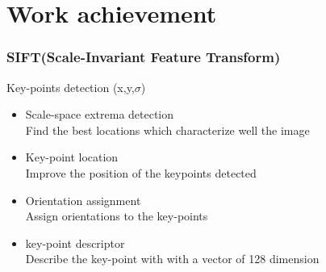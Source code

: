 \documentclass[xcolor=table]{beamer}
\begin{document}
\section{Work achievement}
\begin{frame} \frametitle{SIFT(Scale-Invariant Feature Transform)}

Key-points detection (x,y,$\sigma$)
\begin{itemize}

\item Scale-space extrema detection\\
Find the best locations which characterize well the image

 \item  Key-point location\\
 Improve the position of the keypoints detected

\item Orientation assignment\\
 Assign orientations to the key-points

\item key-point descriptor \\
Describe the key-point with with a vector of 128 dimension
\end{itemize}
\end{frame}
\end{document}
